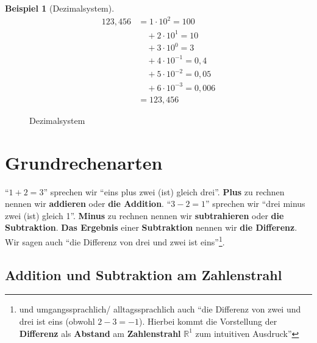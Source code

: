 \documentclass[a4paper]{book}%
\def\width{12}
\def\hauteur{12}
\theoremstyle{definition}
\newtheorem{beispiel}{Beispiel}
\begin{document}
\begin{beispiel}[Dezimalsystem]\label{bsp:Dezimalsystem01}
    \begin{align}\label{eqn:Dezimalsystem01}
      123,456 &= 1 \cdot 10^2 = 100 \\
       & \quad + 2 \cdot 10^1 = 10  \\
       & \quad + 3 \cdot 10^0 = 3 \\
       & \quad + 4 \cdot 10^{-1} = 0,4\\
       & \quad + 5 \cdot 10^{-2} = 0,05\\
       & \quad + 6 \cdot 10^{-3} = 0,006\\
       &= 123,456
    \end{align}
\end{beispiel}

\begin{figure}
  \centering
  \caption{Dezimalsystem}\label{fig:Dezimalsystem01}
\end{figure}


\chapter{Grundrechenarten}\label{Grundrechenarten}

\enquote{$1+2=3$} sprechen wir \enquote{eins plus zwei (ist) gleich drei}. \textbf{Plus} zu rechnen nennen wir \textbf{addieren} oder \textbf{die Addition}. \enquote{$3-2=1$} sprechen wir \enquote{drei minus zwei (ist) gleich 1}. \textbf{Minus} zu rechnen nennen wir \textbf{subtrahieren} oder \textbf{die Subtraktion}. \textbf{Das Ergebnis} einer \textbf{Subtraktion} nennen wir \textbf{die Differenz}. Wir sagen auch \enquote{die Differenz von drei und zwei ist eins}\footnote{und umgangssprachlich/ alltagssprachlich auch \enquote{die Differenz von zwei und drei ist eins (obwohl $2-3=-1$). Hierbei kommt die Vorstellung der \textbf{Differenz} als \textbf{Abstand} am \textbf{Zahlenstrahl} $\mathbb{R}^1$ zum intuitiven Ausdruck}}.

\section{Addition und Subtraktion am Zahlenstrahl}
\end{document}
